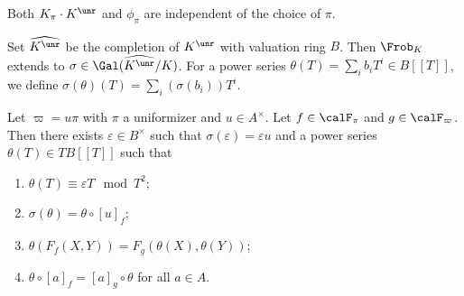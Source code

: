   \begin{theorem}
    Both $K_\pi \cdot K^\unr$ and $\phi_\pi$ are independent of the choice of $\pi$.
  \end{theorem}

  Set $\widehat{K^\unr}$ be the completion of $K^\unr$ with valuation ring $B$.
  Then $\Frob_K$ extends to $\sigma \in \Gal(\widehat{K^\unr} / K)$.
  For a power series $\theta(T) = \sum_i b_i T^i \in B[[T]]$, we define $\sigma(\theta)(T) = \sum_i (\sigma(b_i))T^i$.

  \begin{proposition}
    Let $\varpi = u \pi$ with $\pi$ a uniformizer and $u \in A^\times$.
    Let $f \in \calF_\pi$ and $g \in \calF_\varpi$.
    Then there exists $\varepsilon \in B^\times$ such that $\sigma(\varepsilon) = \varepsilon u$ and a power series $\theta(T) \in T B[[T]]$ such that
    \begin{enumerate}
      \item $\theta(T) \equiv \varepsilon T \mod T^2$;
      \item $\sigma(\theta) = \theta \circ [u]_f$;
      \item $\theta(F_f(X,Y)) = F_g(\theta(X), \theta(Y))$;
      \item $\theta \circ [a]_f = [a]_g \circ \theta$ for all $a \in A$.
    \end{enumerate}
  \end{proposition}
